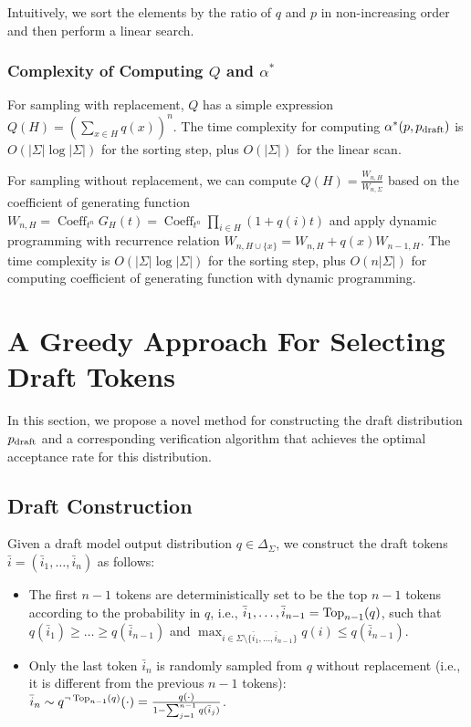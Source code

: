 \documentclass{article}
\makeatletter
\newcommand{\crvspace}{\@ifstar\crvspacestar\crvspacenostar}
\newcommand{\crvspacenostar}[1]{}
\newcommand{\crvspacestar}[1]{}
\makeatother
\begin{document}
Intuitively, we sort the elements by the ratio of $q$ and $p$ in non-increasing order and then perform a linear search.

\subsubsection{Complexity of Computing \texorpdfstring{$Q$}{Q} and \texorpdfstring{$\alpha^\ast$}{alpha*}}
For sampling with replacement, $Q$ has a simple expression $Q(H)=(\sum_{x\in H} q(x))^n$. The time complexity for computing $\alpha^\ast(p,p_{\operatorname{draft}})$ is $O(|\Sigma|\log |\Sigma|)$ for the sorting step, plus $O(|\Sigma|)$ for the linear scan.

For sampling without replacement, we can compute $Q(H)=\frac{W_{n,H}}{W_{n,\Sigma}}$ based on the coefficient of generating function $W_{n,H}=\operatorname{Coeff}_{t^n} G_H(t)=\operatorname{Coeff}_{t^n} \prod_{i\in H}(1+q(i)t)$ and apply dynamic programming with recurrence relation $W_{n,H\cup\{x\}}=W_{n,H}+q(x)W_{n-1,H}$. The time complexity is $O(|\Sigma|\log |\Sigma|)$ for the sorting step, plus $O(n|\Sigma|)$ for computing coefficient of generating function with dynamic programming. \crvspace{-5pt}
\section{A Greedy Approach For Selecting Draft Tokens}\label{se:greedy_approach}
\crvspace{-5pt}
In this section, we propose a novel method for constructing the draft distribution $p_{\operatorname{draft}}$ and a corresponding verification algorithm that achieves the optimal acceptance rate for this distribution.

\crvspace{-5pt}
\subsection{Draft Construction}
\crvspace{-3pt}
Given a draft model output distribution $q\in\Delta_\Sigma$, we construct the draft tokens $\bar{i}=(\bar{i}_1,\dots,\bar{i}_n)$ as follows:
\begin{itemize}[leftmargin=*,noitemsep=0mm,topsep=-2pt]
\item The first $n-1$ tokens are deterministically set to be the top $n-1$ tokens according to the probability in $q$, i.e., $\bar{i}_1,\dots,\bar{i}_{n-1}=\operatorname{Top}_{n-1}(q)$, such that $q(\bar{i}_1)\geq\dots\geq q(\bar{i}_{n-1})$ and $\max_{i\in\Sigma\setminus\{\bar{i}_1,\dots,\bar{i}_{n-1}\}} q(i)\leq q(\bar{i}_{n-1})$.
\item Only the last token $\bar{i}_{n}$ is randomly sampled from $q$ without replacement (i.e., it is different from the previous $n-1$ tokens): $\bar{i}_{n}\sim q^{\neg \operatorname{Top}_{n-1}(q)}(\cdot)=\frac{q(\cdot)}{1-\sum_{j=1}^{n-1}q(\bar{i}_j)}$.
\end{itemize}
\end{document}
